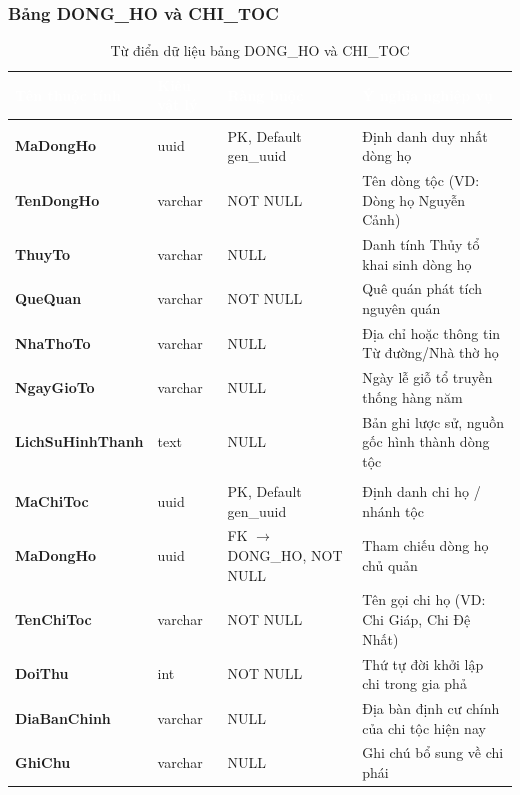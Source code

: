 \subsubsection{Bảng DONG\_HO và CHI\_TOC}
\begin{table}[H]
\centering\small
\renewcommand{\arraystretch}{1.3}
\begin{tabularx}{\textwidth}{|>{\raggedright\arraybackslash\bfseries}p{3.2cm}|>{\raggedright\arraybackslash}p{2.3cm}|>{\raggedright\arraybackslash}p{3.2cm}|>{\raggedright\arraybackslash}X|}
\hline
\rowcolor{tableheader}
\textcolor{white}{\textbf{Tên thuộc tính}} & \textcolor{white}{\textbf{Kiểu vật lý}} & \textcolor{white}{\textbf{Ràng buộc}} & \textcolor{white}{\textbf{Ý nghĩa nghiệp vụ}} \\
\hline
\multicolumn{4}{|l|}{\cellcolor{softblue}\textbf{Bảng DONG\_HO (Dòng họ)}} \\
\hline
MaDongHo & uuid & PK, Default gen\_uuid & Định danh duy nhất dòng họ \\
\hline
TenDongHo & varchar & NOT NULL & Tên dòng tộc (VD: Dòng họ Nguyễn Cảnh) \\
\hline
ThuyTo & varchar & NULL & Danh tính Thủy tổ khai sinh dòng họ \\
\hline
QueQuan & varchar & NOT NULL & Quê quán phát tích nguyên quán \\
\hline
NhaThoTo & varchar & NULL & Địa chỉ hoặc thông tin Từ đường/Nhà thờ họ \\
\hline
NgayGioTo & varchar & NULL & Ngày lễ giỗ tổ truyền thống hàng năm \\
\hline
LichSuHinhThanh & text & NULL & Bản ghi lược sử, nguồn gốc hình thành dòng tộc \\
\hline
\multicolumn{4}{|l|}{\cellcolor{softblue}\textbf{Bảng CHI\_TOC (Chi họ / Phái)}} \\
\hline
MaChiToc & uuid & PK, Default gen\_uuid & Định danh chi họ / nhánh tộc \\
\hline
MaDongHo & uuid & FK $\to$ DONG\_HO, NOT NULL & Tham chiếu dòng họ chủ quản \\
\hline
TenChiToc & varchar & NOT NULL & Tên gọi chi họ (VD: Chi Giáp, Chi Đệ Nhất) \\
\hline
DoiThu & int & NOT NULL & Thứ tự đời khởi lập chi trong gia phả \\
\hline
DiaBanChinh & varchar & NULL & Địa bàn định cư chính của chi tộc hiện nay \\
\hline
GhiChu & varchar & NULL & Ghi chú bổ sung về chi phái \\
\hline
\end{tabularx}
\caption{Từ điển dữ liệu bảng DONG\_HO và CHI\_TOC}
\label{tab:dict_dong_ho_chi_toc}
\end{table}

